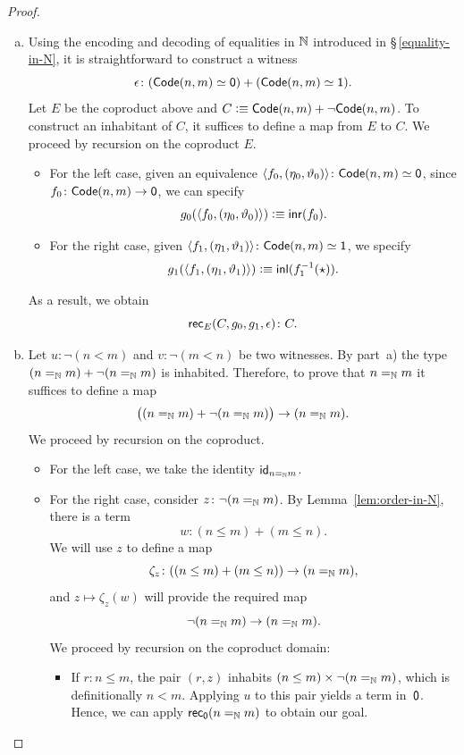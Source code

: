 \begin{proof}\ 
    \begin{enumerate}[a), font=\upshape]
        \item Using the encoding and decoding of equalities in $\mathbb{N}$ introduced in \S\,\ref{equality-in-N}, it is straightforward to construct a witness
        \[
            \epsilon\colon
                (\fun{Code}(n,m)\simeq\fun0)
                +(\fun{Code}(n,m)\simeq\fun1).
        \]
        Let $E$ be the coproduct above and $C\mathrel{\vcentcolon}\equiv\mathsf{Code}(n,m)+\neg\mathsf{Code}(n,m)$. To construct an inhabitant of $C$, it suffices to define a map from $E$ to $C$. We proceed by recursion on the coproduct $E$.
        \begin{itemize}
            \item For the left case, given an equivalence $\dep{f_0,(\eta_0,\vartheta_0)}\colon\fun{Code}(n,m)\simeq\fun0$, since $f_0\colon\fun{Code}(n,m)\to\fun0$, we can specify
            \[
                g_0(\langle f_0,(\eta_0,\vartheta_0)\rangle)
                    \mathrel{\vcentcolon}\equiv\mathsf{inr}(f_0).
            \]
            \item For the right case, given $\dep{f_1,(\eta_1,\vartheta_1)}\colon\fun{Code}(n,m)\simeq\fun1$, we specify
            \[
                g_1(\langle f_1,(\eta_1,\vartheta_1)\rangle)
                    \mathrel{\vcentcolon}\equiv\mathsf{inl}(f_1^{-1}({\mathsf{\star}})).
            \]
        \end{itemize}
        As a result, we obtain
        \[
            \fun{rec}_E(C,g_0,g_1,\epsilon)\colon C.
        \]
        
        \item Let $u\colon\neg(n<m)$ and $v\colon\neg(m<n)$ be two witnesses. By part~a) the type $(n\mathrel{=_{\mathbb{N}}} m)+\neg(n\mathrel{=_{\mathbb{N}}} m)$ is inhabited. Therefore, to prove that $n\mathrel{=_{\mathbb{N}}} m$ it suffices to define a map
        \[
            \bigl((n\mathrel{=_{\mathbb{N}}} m)+\neg(n\mathrel{=_{\mathbb{N}}} m)\bigr)\to(n\mathrel{=_{\mathbb{N}}} m).
        \]
        We proceed by recursion on the coproduct.
        \begin{itemize}
            \item For the left case, we take the identity $\mathsf{id}_{n\mathrel{=_{\mathbb{N}}} m}$.
            
            \item For the right case, consider $z\colon\neg(n\eq\N m)$. By Lemma~\ref{lem:order-in-N}, there is a term
            \[
                w\colon(n\le m)+(m\le n).
            \]
            We will use $z$ to define a map
            \[
                \zeta_z\colon ((n\le m)+(m\le n))\to(n\eq\N m),
            \]
            and $z\mapsto\zeta_z(w)$ will provide the required map 
            \[
                \neg(n\mathrel{=_{\mathbb{N}}} m)\to(n\mathrel{=_{\mathbb{N}}} m).
            \]
            We proceed by recursion on the coproduct domain:
            \begin{itemize}
                \item If $r\colon n\le m$, the pair $(r,z)$ inhabits $(n\le m)\times\neg(n\mathrel{=_{\mathbb{N}}} m)$, which is definitionally $n<m$. Applying $u$ to this pair yields a term in~$\mathsf{0}$. Hence, we can apply $\mathsf{rec}_{\mathsf{0}}(n\mathrel{=_{\mathbb{N}}} m)$ to obtain our goal.
                

\end{itemize}
\end{itemize}
\end{enumerate}
\end{proof}

